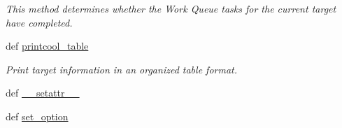 \begin{DoxyCompactItemize}
\begin{DoxyCompactList}\small\item\em This method determines whether the Work Queue tasks for the current target have completed. \end{DoxyCompactList}\item 
def \hyperlink{classforcebalance_1_1target_1_1Target_ac30a4e9d7d9fe06f7caefa5f7cfab09b}{printcool\-\_\-table}
\begin{DoxyCompactList}\small\item\em Print target information in an organized table format. \end{DoxyCompactList}\item 
def \hyperlink{classforcebalance_1_1BaseClass_a0c851d413c3b2f30561b72a46771bcff}{\-\_\-\-\_\-setattr\-\_\-\-\_\-}
\item 
def \hyperlink{classforcebalance_1_1BaseClass_a73e9a37a7632e79eb99f49bd15aced45}{set\-\_\-option}
\end{DoxyCompactItemize}
